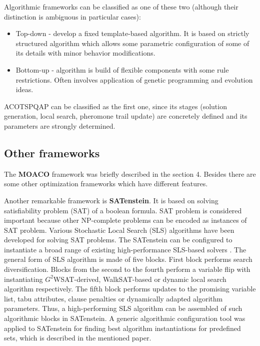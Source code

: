\documentclass[12pt]{article}
\begin{document}
Algorithmic frameworks can be classified as one of these two (although their distinction is ambiguous in particular cases):
\begin{itemize}
\item Top-down - develop a fixed template-based algorithm. It is based on strictly structured algorithm which allows some parametric configuration of some of its details with minor behavior modifications.
\item Bottom-up - algorithm is build of flexible components with some rule restrictions. Often involves application of genetic programming and evolution ideas.
\end{itemize}

ACOTSPQAP can be classified as the first one, since its stages (solution generation, local search, pheromone trail update) are concretely defined and its parameters are strongly determined.

\subsection{Other frameworks}

The \textbf{MOACO} framework was briefly described in the section 4. Besides there are some other optimization frameworks which have different features.

Another remarkable framework is \textbf{SATenstein}. It is based on solving satisfiability problem (SAT) of a boolean formula. SAT problem is considered important because other NP-complete problems can be encoded as instances of SAT problem. Various Stochastic Local Search (SLS) algorithms have been developed for solving SAT problems. The SATenstein can be configured to instantiate a broad range of existing high-performance SLS-based solvers \cite{satenstein}. The general form of SLS algorithm is made of five blocks. First block performs search diversification. Blocks from the second to the fourth perform a variable flip with instantiating $G^2$WSAT-derived, WalkSAT-based or dynamic local search algorithm respectively. The fifth block performs updates to the promising variable list, tabu attributes, clause penalties or dynamically adapted algorithm parameters. Thus, a high-performing SLS algorithm can be assembled of such algorithmic blocks in SATenstein. A generic algorithmic configuration tool was applied to SATenstein for finding best algorithm instantiations for predefined sets, which is described in the mentioned paper.
\end{document}
